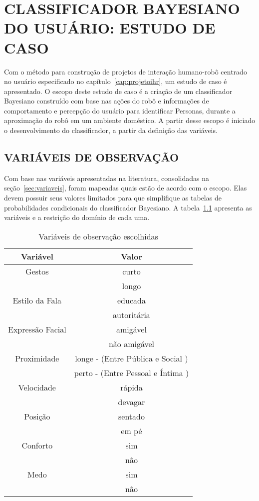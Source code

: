 \chapter{CLASSIFICADOR BAYESIANO DO USUÁRIO: ESTUDO DE CASO}
\label{cap:estudocaso}
Com o método para construção de projetos de interação humano-robô centrado no usuário especificado no capítulo~\ref{cap:projetoihr}, um estudo de caso é apresentado. O escopo deste estudo de caso é a criação de um classificador Bayesiano construído com base nas ações do robô e informações de comportamento e percepção do usuário para identificar Personas, durante a aproximação do robô em um ambiente doméstico. A partir desse escopo é iniciado o desenvolvimento do classificador, a partir da definição das variáveis.

\section{VARIÁVEIS DE OBSERVAÇÃO}
\label{sec:ec_variaveis}
Com base nas variáveis apresentadas na literatura, consolidadas na seção~\ref{sec:variaveis}, foram mapeadas quais estão de acordo com o escopo. Elas devem possuir seus valores limitados para que simplifique as tabelas de probabilidades condicionais do classificador Bayesiano. A tabela~\ref{tab:variaveisvalores} apresenta as variáveis e a restrição do domínio de cada uma. 

\begin{table}[!ht]
	\caption{Variáveis de observação escolhidas}
	\label{tab:variaveisvalores}
	\centering
	\begin{tabular}{c | c}
		\hline
		Variável & Valor \\
		\hline
		Gestos & curto \\
		& longo \\
		\hline
		Estilo da Fala & educada \\
		& autoritária \\
		\hline
		Expressão Facial & amigável \\
		& não amigável \\
		\hline
		Proximidade & longe - (Entre Pública e Social ) \\
		& perto - (Entre Pessoal e Íntima ) \\
		\hline
		Velocidade & rápida \\
		& devagar \\
		\hline
		Posição & sentado \\
		& em pé \\
		\hline
		Conforto & sim \\
		& não \\
		\hline
		Medo & sim \\
		& não \\
		\hline
	\end{tabular}
\end{table}

